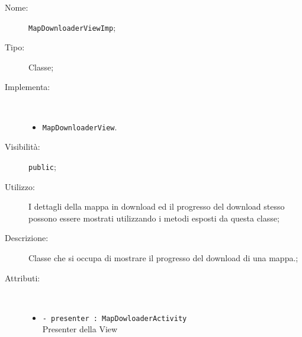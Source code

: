\documentclass[../DefinizioneDiProdotto.tex]{subfiles}
\begin{document}
    \begin{description}
\item[Nome:] \texttt{MapDownloaderViewImp};
\item[Tipo:] Classe;
\item[Implementa:] \
\begin{itemize}
\item \texttt{MapDownloaderView}.

\end{itemize}
\item[Visibilità:] \texttt{public};
\item[Utilizzo:] I dettagli della mappa in download ed il progresso del download stesso possono essere mostrati utilizzando i metodi esposti da questa classe;
\item[Descrizione:] Classe che si occupa di mostrare il progresso del download di una mappa.;
\item[Attributi:] \
\begin{itemize}
\item \texttt{- presenter : MapDowloaderActivity}\\
Presenter della View


\end{itemize}
\end{description}
\end{document}
